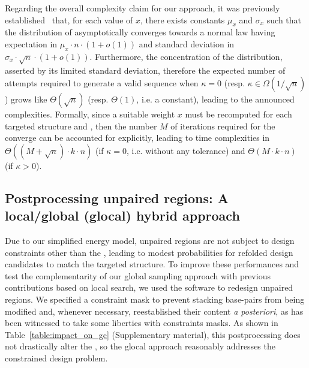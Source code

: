 Regarding the overall complexity claim for our approach, it was previously established~\cite{Waldispuhl2011} that, for each value of $x$, there exists constants $\mu_x$ and $\sigma_x$ such that the distribution of \GCContent asymptotically converges towards a normal law having expectation in $\mu_x\cdot n\cdot(1+o(1))$ and standard deviation in $\sigma_x\cdot\sqrt{n}\cdot(1+o(1))$.
Furthermore, the concentration of the distribution, asserted by its limited standard deviation, therefore the expected number of attempts required to generate a valid sequence when $\kappa=0$ (resp. $\kappa\in\Omega(1/\sqrt n)$) grows like $\Theta(\sqrt{n})$ (resp. $\Theta(1)$, i.e. a constant), leading to the announced complexities. Formally, since a suitable weight $x$ must be recomputed for each targeted structure and \GCContent, then the number $M$ of iterations required for the converge can be accounted for explicitly, leading to time complexities in $\Theta((M+\sqrt{n})\cdot k\cdot n)$ (if $\kappa=0$, i.e. without any tolerance) and $\Theta(M\cdot k\cdot n)$ (if $\kappa>0$).



\subsection{Postprocessing unpaired regions: A local/global (glocal) hybrid approach}
\label{subsec:glocal_method}
Due to our simplified energy model, unpaired regions are not subject to design constraints other than the \GCContent, leading to modest probabilities for refolded design candidates to match the targeted structure. To improve these performances and test the complementarity  of our global sampling approach with previous contributions based on local search, we used the \RNAinverse software to redesign unpaired regions. We specified a constraint mask to prevent stacking base-pairs from being modified and, whenever necessary, reestablished their content {\em a posteriori}, as \RNAinverse has been witnessed to take some liberties with constraints masks. As shown in Table~\ref{table:impact_on_gc} (Supplementary material), this postprocessing does not drastically alter the \GCContent, so the glocal approach reasonably addresses the constrained \GCContent design problem.


